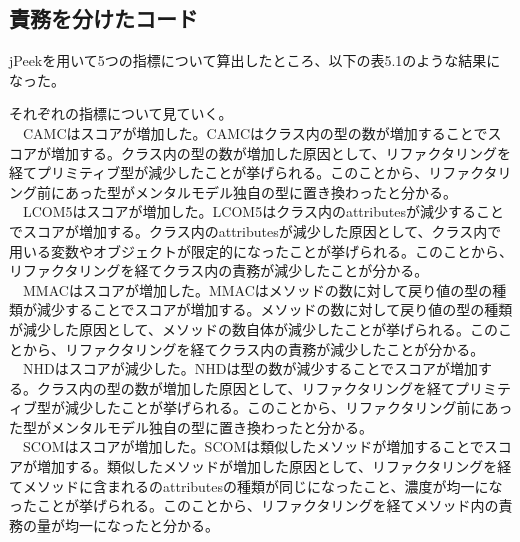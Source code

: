 \documentclass[11pt, a4paper]{jreport}
\begin{document}
\subsection{責務を分けたコード}
jPeekを用いて5つの指標について算出したところ、以下の表5.1のような結果になった。
\begin{table}[H]
\centering
\caption{jPeekによる算出結果}
\label{ttt}
\end{table}
それぞれの指標について見ていく。
\\　CAMCはスコアが増加した。CAMCはクラス内の型の数が増加することでスコアが増加する。クラス内の型の数が増加した原因として、リファクタリングを経てプリミティブ型が減少したことが挙げられる。このことから、リファクタリング前にあった型がメンタルモデル独自の型に置き換わったと分かる。
\\　LCOM5はスコアが増加した。LCOM5はクラス内のattributesが減少することでスコアが増加する。クラス内のattributesが減少した原因として、クラス内で用いる変数やオブジェクトが限定的になったことが挙げられる。このことから、リファクタリングを経てクラス内の責務が減少したことが分かる。
\\　MMACはスコアが増加した。MMACはメソッドの数に対して戻り値の型の種類が減少することでスコアが増加する。メソッドの数に対して戻り値の型の種類が減少した原因として、メソッドの数自体が減少したことが挙げられる。このことから、リファクタリングを経てクラス内の責務が減少したことが分かる。
\\　NHDはスコアが減少した。NHDは型の数が減少することでスコアが増加する。クラス内の型の数が増加した原因として、リファクタリングを経てプリミティブ型が減少したことが挙げられる。このことから、リファクタリング前にあった型がメンタルモデル独自の型に置き換わったと分かる。
\\　SCOMはスコアが増加した。SCOMは類似したメソッドが増加することでスコアが増加する。類似したメソッドが増加した原因として、リファクタリングを経てメソッドに含まれるのattributesの種類が同じになったこと、濃度が均一になったことが挙げられる。このことから、リファクタリングを経てメソッド内の責務の量が均一になったと分かる。
\end{document}
